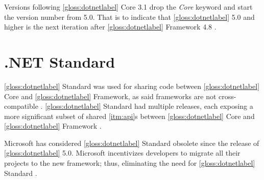 Versions following \ref{gloss:dotnetlabel} Core 3.1 drop the \textit{Core} keyword and start the version number from 5.0. That is to indicate that \ref{gloss:dotnetlabel} 5.0 and higher is the next iteration after \ref{gloss:dotnetlabel} Framework 4.8 \cite{lander_introducing_2019}.

\section{.NET Standard} \label{sec:netStandard}
\ref{gloss:dotnetlabel} Standard was used for sharing code between \ref{gloss:dotnetlabel} Core and \ref{gloss:dotnetlabel} Framework, as said frameworks are not cross-compatible \cite{code_maze_differences_2022}. \ref{gloss:dotnetlabel} Standard had multiple releases, each exposing a more significant subset of shared \ref{itm:api}s between \ref{gloss:dotnetlabel} Core and \ref{gloss:dotnetlabel} Framework \cite{code_maze_differences_2022}.

Microsoft has considered \ref{gloss:dotnetlabel} Standard obsolete since the release of \ref{gloss:dotnetlabel} 5.0. Microsoft incentivizes developers to migrate all their projects to the new framework; thus, eliminating the need for \ref{gloss:dotnetlabel} Standard \cite{landwerth_future_2020}.